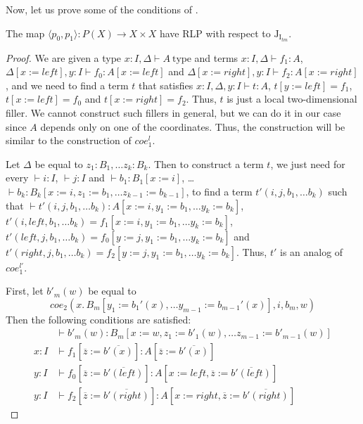 \documentclass{mscs}
\newcommand{\repl}{:=}
\newcommand{\leftI}{\mathit{left}}
\newcommand{\rightI}{\mathit{right}}
\newcommand{\coe}{\mathit{coe}}
\newcommand{\type}{\mathrm{type}}
\newcommand{\I}{\mathrm{I}}
\newcommand{\J}{\mathrm{J}}
\numberwithin{figure}{section}
\begin{document}
Now, let us prove some of the conditions of .
\begin{lem}[Jtm]
The map $\langle p_0, p_1 \rangle : P(X) \to X \times X$ have RLP with respect to $\J_{\I_{tm}}$.
\end{lem}
\begin{proof}
We are given a type $x : I, \Delta \vdash A\ \type$ and terms $x : I, \Delta \vdash f_1 : A$, $\Delta[x \repl \leftI], y : I \vdash f_0 : A[x \repl \leftI]$ and $\Delta[x \repl \rightI], y : I \vdash f_2 : A[x \repl \rightI]$,
and we need to find a term $t$ that satisfies $x : I, \Delta, y : I \vdash t : A$, $t[y \repl \leftI] = f_1$, $t[x \repl \leftI] = f_0$ and $t[x \repl \rightI] = f_2$.
Thus, $t$ is just a local two-dimensional filler.
We cannot construct such fillers in general, but we can do it in our case since $A$ depends only on one of the coordinates.
Thus, the construction will be similar to the construction of $\coe^l_1$.

Let $\Delta$ be equal to $z_1 : B_1, \ldots z_k : B_k$.
Then to construct a term $t$, we just need for every $\vdash i : I$, $\vdash j : I$ and $\vdash b_1 : B_1[x \repl i]$, \ldots $\vdash b_k : B_k[x \repl i, z_1 \repl b_1, \ldots z_{k-1} \repl b_{k-1}]$,
to find a term $t'(i, j, b_1, \ldots b_k)$ such that $\vdash t'(i, j, b_1, \ldots b_k) : A[x \repl i, y_1 \repl b_1, \ldots y_k \repl b_k]$, $t'(i, \leftI, b_1, \ldots b_k) = f_1[x \repl i, y_1 \repl b_1, \ldots y_k \repl b_k]$,
$t'(\leftI, j, b_1, \ldots b_k) = f_0[y \repl j, y_1 \repl b_1, \ldots y_k \repl b_k]$ and $t'(\rightI, j, b_1, \ldots b_k) = f_2[y \repl j, y_1 \repl b_1, \ldots y_k \repl b_k]$.
Thus, $t'$ is an analog of $\coe^{l'}_1$.

First, let $b'_m(w)$ be equal to
\[ \coe_2(x.\,B_m[y_1 \repl b_1'(x), \ldots y_{m-1} \repl b_{m-1}'(x)], i, b_m, w) \]
Then the following conditions are satisfied:
\begin{align*}
& \vdash b'_m(w) : B_m[x \repl w, z_1 \repl b'_1(w), \ldots z_{m-1} \repl b'_{m-1}(w)] \\
x : I & \vdash f_1[\overline{z} \repl \overline{b'(x)}] : A[\overline{z} \repl \overline{b'(x)}] \\
y : I & \vdash f_0[\overline{z} \repl \overline{b'(\leftI)}] : A[x \repl \leftI, \overline{z} \repl \overline{b'(\leftI)}] \\
y : I & \vdash f_2[\overline{z} \repl \overline{b'(\rightI)}] : A[x \repl \rightI, \overline{z} \repl \overline{b'(\rightI)}]
\end{align*}
\end{proof}
\end{document}
